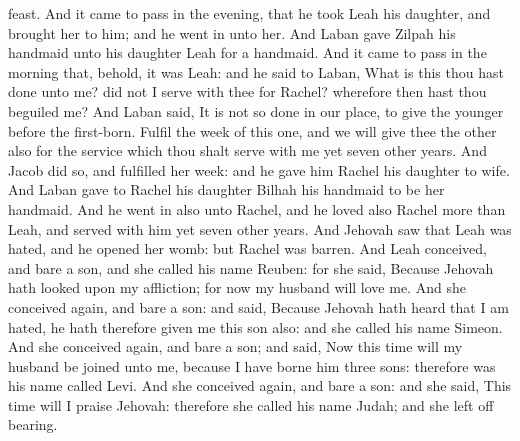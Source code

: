 feast. And it came to pass in the evening, that he took Leah his daughter, and brought her to him; and he went in unto her. And Laban gave Zilpah his handmaid unto his daughter Leah for a handmaid. And it came to pass in the morning that, behold, it was Leah: and he said to Laban, What is this thou hast done unto me? did not I serve with thee for Rachel? wherefore then hast thou beguiled me? And Laban said, It is not so done in our place, to give the younger before the first-born. Fulfil the week of this one, and we will give thee the other also for the service which thou shalt serve with me yet seven other years. And Jacob did so, and fulfilled her week: and he gave him Rachel his daughter to wife. And Laban gave to Rachel his daughter Bilhah his handmaid to be her handmaid. And he went in also unto Rachel, and he loved also Rachel more than Leah, and served with him yet seven other years.  And Jehovah saw that Leah was hated, and he opened her womb: but Rachel was barren. And Leah conceived, and bare a son, and she called his name Reuben: for she said, Because Jehovah hath looked upon my affliction; for now my husband will love me. And she conceived again, and bare a son: and said, Because Jehovah hath heard that I am hated, he hath therefore given me this son also: and she called his name Simeon. And she conceived again, and bare a son; and said, Now this time will my husband be joined unto me, because I have borne him three sons: therefore was his name called Levi. And she conceived again, and bare a son: and she said, This time will I praise Jehovah: therefore she called his name Judah; and she left off bearing. 

